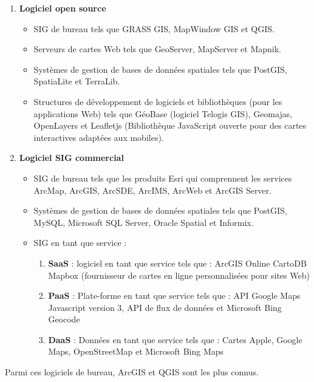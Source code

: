 \documentclass[french, a4paper, 12pt]{report}
\begin{document}
\begin{enumerate}
\item \textbf{Logiciel open source} 
\begin{itemize}
     \item SIG de bureau tels que GRASS GIS, MapWindow GIS et QGIS.
     \item Serveurs de cartes Web tels que GeoServer, MapServer et Mapnik.
     \item Systèmes de gestion de bases de données spatiales tels que PostGIS, SpatiaLite et TerraLib.
     \item Structures de développement de logiciels et bibliothèques (pour les applications Web) tels que GéoBase (logiciel Telogis GIS), Geomajas, OpenLayers et Leafletjs (Bibliothèque JavaScript ouverte pour des cartes interactives adaptées aux mobiles). 
   \end{itemize}
\item \textbf{Logiciel SIG commercial } 
\begin{itemize}
     \item SIG de bureau tels que les produits Esri qui comprennent les services ArcMap, ArcGIS, ArcSDE, ArcIMS, ArcWeb et ArcGIS Server.
     \item Systèmes de gestion de bases de données spatiales tels que PostGIS, MySQL, Microsoft SQL Server, Oracle Spatial et Informix. 
     \item SIG en tant que service :
     \begin{enumerate}
         \item \textbf {SaaS} : logiciel en tant que service tels que : ArcGIS Online CartoDB Mapbox (fournisseur de cartes en ligne personnalisées pour sites Web)
         \item \textbf {PaaS} : Plate-forme en tant que service tels que : API Google Maps Javascript version 3, API de flux de données et Microsoft Bing Geocode 
         \item \textbf {DaaS} : Données en tant que service tels que : Cartes Apple, Google Maps, OpenStreetMap et Microsoft Bing Maps 
       \end{enumerate}
   \end{itemize}
\end{enumerate} 
Parmi ces logiciels de bureau, ArcGIS et QGIS sont les plus connus. 
\end{document}
